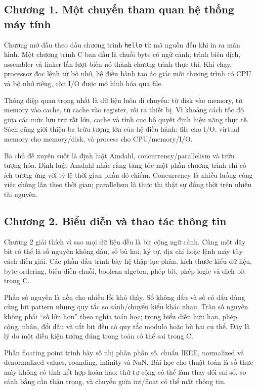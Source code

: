 \documentclass[11pt]{article}
\begin{document}
\subsection*{Chương 1. Một chuyến tham quan hệ thống máy tính}

Chương mở đầu theo dấu chương trình \texttt{hello} từ mã nguồn đến khi in ra
màn hình. Một chương trình C ban đầu là chuỗi byte có ngữ cảnh; trình biên dịch,
assembler và linker lần lượt biến nó thành chương trình thực thi. Khi chạy,
processor đọc lệnh từ bộ nhớ, hệ điều hành tạo ảo giác mỗi chương trình có CPU
và bộ nhớ riêng, còn I/O được mô hình hóa qua file.

Thông điệp quan trọng nhất là dữ liệu luôn di chuyển: từ disk vào memory, từ
memory vào cache, từ cache vào register, rồi ra thiết bị. Vì khoảng cách tốc độ
giữa các mức lưu trữ rất lớn, cache và tính cục bộ quyết định hiệu năng thực tế.
Sách cũng giới thiệu ba trừu tượng lớn của hệ điều hành: file cho I/O, virtual
memory cho memory/disk, và process cho CPU/memory/I/O.

Ba chủ đề xuyên suốt là định luật Amdahl, concurrency/parallelism và trừu
tượng hóa. Định luật Amdahl nhắc rằng tăng tốc một phần chương trình chỉ có
ích tương ứng với tỷ lệ thời gian phần đó chiếm. Concurrency là nhiều luồng công
việc chồng lấn theo thời gian; parallelism là thực thi thật sự đồng thời trên nhiều
tài nguyên.

\subsection*{Chương 2. Biểu diễn và thao tác thông tin}

Chương 2 giải thích vì sao mọi dữ liệu đều là bit cộng ngữ cảnh. Cùng một dãy
bit có thể là số nguyên không dấu, số bù hai, ký tự, địa chỉ hoặc lệnh máy tùy
cách diễn giải. Các phần đầu trình bày hệ thập lục phân, kích thước kiểu dữ
liệu, byte ordering, biểu diễn chuỗi, boolean algebra, phép bit, phép logic và
dịch bit trong C.

Phần số nguyên là nền cho nhiều lỗi khó thấy. Số không dấu và số có dấu dùng
cùng bit pattern nhưng quy tắc so sánh/chuyển kiểu khác nhau. Tràn số nguyên
không phải ``số lớn hơn'' theo nghĩa toán học; trong biểu diễn hữu hạn, phép
cộng, nhân, đổi dấu và cắt bit đều có quy tắc modulo hoặc bù hai cụ thể. Đây là
lý do một điều kiện tưởng đúng trong toán có thể sai trong C.

Phần floating point trình bày số nhị phân phân số, chuẩn IEEE, normalized và
denormalized values, rounding, infinity và NaN. Bài học cho thuật toán là số
thực máy không có tính kết hợp hoàn hảo; thứ tự cộng có thể làm thay đổi sai
số, so sánh bằng cần thận trọng, và chuyển giữa int/float có thể mất thông tin.
\end{document}
